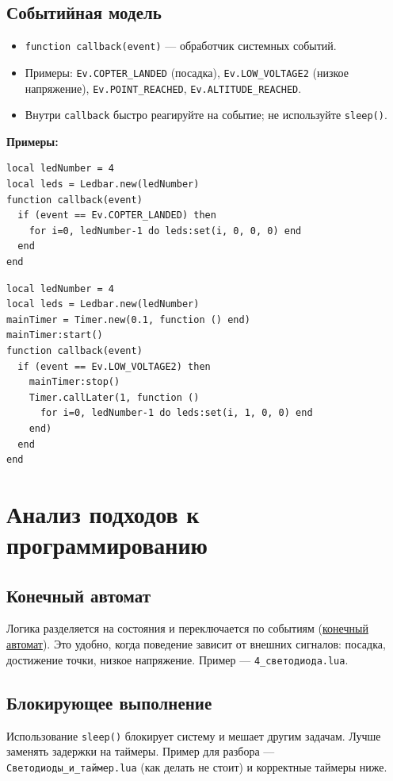 \documentclass[a4paper,12pt]{article}
\begin{document}
\subsection{Событийная модель}
\begin{itemize}
  \item \verb|function callback(event)| — обработчик системных событий.
  \item Примеры: \verb|Ev.COPTER_LANDED| (посадка), \verb|Ev.LOW_VOLTAGE2| (низкое напряжение), \verb|Ev.POINT_REACHED|, \verb|Ev.ALTITUDE_REACHED|.
  \item Внутри \verb|callback| быстро реагируйте на событие; не используйте \verb|sleep()|.
\end{itemize}
\textbf{Примеры:}
\begin{lstlisting}[style=lua,caption={Посадка — выключить индикацию}]
local ledNumber = 4
local leds = Ledbar.new(ledNumber)
function callback(event)
  if (event == Ev.COPTER_LANDED) then
    for i=0, ledNumber-1 do leds:set(i, 0, 0, 0) end
  end
end
\end{lstlisting}
\begin{lstlisting}[style=lua,caption={Низкое напряжение — аварийный красный}]
local ledNumber = 4
local leds = Ledbar.new(ledNumber)
mainTimer = Timer.new(0.1, function () end)
mainTimer:start()
function callback(event)
  if (event == Ev.LOW_VOLTAGE2) then
    mainTimer:stop()
    Timer.callLater(1, function ()
      for i=0, ledNumber-1 do leds:set(i, 1, 0, 0) end
    end)
  end
end
\end{lstlisting}

\section{Анализ подходов к программированию}
\subsection{Конечный автомат}
Логика разделяется на состояния и переключается по событиям (\hyperlink{term:automaton}{конечный автомат}). Это удобно, когда поведение зависит от внешних сигналов: посадка, достижение точки, низкое напряжение. Пример — \verb|4_светодиода.lua|.
\subsection{Блокирующее выполнение}
Использование \verb|sleep()| блокирует систему и мешает другим задачам. Лучше заменять задержки на таймеры. Пример для разбора — \verb|Светодиоды_и_таймер.lua| (как делать не стоит) и корректные таймеры ниже.
\end{document}
